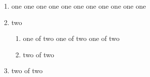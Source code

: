\documentclass[11pt,a4paper]{article}
\begin{document}
\begin{enumerate}[EX i.]
\item one one one one one one one
one one one one\label{LA}
\item two
\begin{enumerate}[{example} a)]
\item one of two one of two
one of two\label{LB}
\item two of two
\end{enumerate}
\item two of two
\end{enumerate}
\end{document}

